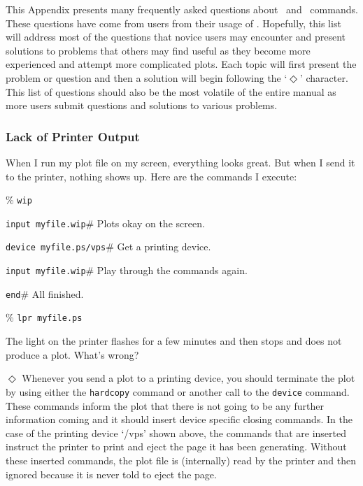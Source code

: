 %
%

This Appendix presents many frequently asked questions about \wip\ and
\wip\ commands.
These questions have come from users from their usage of \wip.
Hopefully, this list will address most of the questions
that novice users may encounter and present solutions to problems that
others may find useful as they become more experienced and attempt more
complicated plots.
Each topic will first present the problem or question and then a
solution will begin following the `$\Diamond$' character.
This list of questions should also be the most volatile of the entire
manual as more users submit questions and solutions to various problems.

\subsubsection*         {Lack of Printer Output}

When I run my plot file on my screen, everything looks great.
But when I send it to the printer, nothing shows up.
Here are the commands I execute:
\begin{wiplist}%
  \item [\%] {\tt wip}
\samepage
  \item {\tt input myfile.wip}\hfill\# Plots okay on the screen.
  \item {\tt device myfile.ps/vps}\hfill\# Get a printing device.
  \item {\tt input myfile.wip}\hfill\# Play through the commands again.
  \item {\tt end}\hfill\# All finished.
  \item [\%] {\tt lpr myfile.ps}
\end{wiplist}
The light on the printer flashes for a few minutes and then stops and
does not produce a plot.
What's wrong?

\indent$\Diamond$
Whenever you send a plot to a printing device, you should
terminate the plot by using either the
{\tt hardcopy} command or
another call to the {\tt device} command.
These commands inform
the plot that there is not going to be any further information
coming and it should
insert device specific closing commands.  In the case of the
printing device `/vps' shown above, the commands that are
inserted instruct the printer to print and eject the page it has
been generating.
Without these inserted commands,
the plot file is (internally) read by the printer and then ignored
because it is never told to eject the page.

